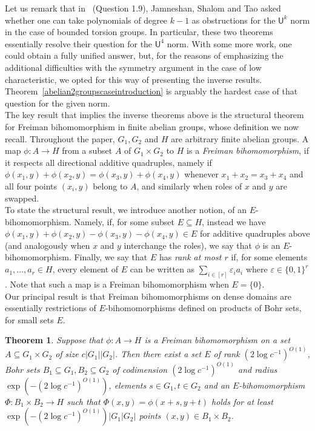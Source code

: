 \documentclass[a4paper,11pt]{article}
\newtheorem{theorem}{Theorem}
\numberwithin{theorem}{section}
\theoremstyle{definition}
\begin{document}
Let us remark that in~\cite{JamneshanShalomTao} (Question 1.9), Jamneshan, Shalom and Tao asked whether one can take polynomials of degree $k-1$ as obstructions for the $\mathsf{U}^k$ norm in the case of bounded torsion groups. In particular, these two theorems essentially resolve their question for the $\mathsf{U}^4$ norm. With some more work, one could obtain a fully unified answer, but, for the reasons of emphasizing the additional difficulties with the symmetry argument in the case of low characteristic, we opted for this way of presenting the inverse results. Theorem~\ref{abelian2groupscaseintroduction} is arguably the hardest case of that question for the given norm.\\[12pt]

The key result that implies the inverse theorems above is the structural theorem for Freiman bihomomorphism in finite abelian groups, whose definition we now recall. Throughout the paper, $G_1, G_2$ and $H$ are arbitrary finite abelian groups. A map  $\phi : A \to H$ from a subset $A$ of $G_1 \times G_2$ to $H$ is a \textit{Freiman bihomomorphism}, if it respects all directional additive quadruples, namely if $\phi(x_1, y) + \phi(x_2, y) = \phi(x_3, y) + \phi(x_4,y)$ whenever $x_1 + x_2 = x_3 + x_4$ and all four points $(x_i, y)$ belong to $A$, and similarly when roles of $x$ and $y$ are swapped.\\
To state the structural result, we introduce another notion, of an $E$-bihomomorphism. Namely, if, for some subset $E \subseteq H$, instead we have $\phi(x_1, y) + \phi(x_2, y) - \phi(x_3, y) - \phi(x_4,y) \in E$ for additive quadruples above (and analogously when $x$ and $y$ interchange the roles), we say that $\phi$ is an $E$-bihomomorphism. Finally, we say that $E$ has \textit{rank at most $r$} if, for some elements $a_1, \dots, a_r \in H$, every element of $E$ can be written as $\sum_{i \in [r]} \varepsilon_i a_i$ where $\varepsilon \in \{0,1\}^r$. Note that such a map is a Freiman bihomomorphism when $E = \{0\}$.\\
Our principal result is that Freiman bihomomorphisms on dense domains are essentially restrictions of $E$-bihomomorphisms defined on products of Bohr sets, for small sets $E$.

\begin{theorem}\label{maininversetheorem}
    Suppose that $\phi : A \to H$ is a Freiman bihomomorphism on a set $A \subseteq G_1 \times G_2$ of size $c |G_1||G_2|$. Then there exist a set $E$ of rank $(2\log c^{-1})^{O(1)}$, Bohr sets $B_1 \subseteq G_1, B_2 \subseteq G_2$ of codimension $(2\log c^{-1})^{O(1)}$ and radius $\exp(-(2\log c^{-1})^{O(1)})$, elements $s \in G_1,t\in G_2$ and an $E$-bihomomorphism $\Phi : B_1 \times B_2 \to H$ such that $\Phi(x,y) = \phi(x + s,y + t)$ holds for at least $\exp(-(2\log c^{-1})^{O(1)})|G_1|G_2|$ points $(x,y) \in B_1 \times B_2$.
\end{theorem}
\end{document}

